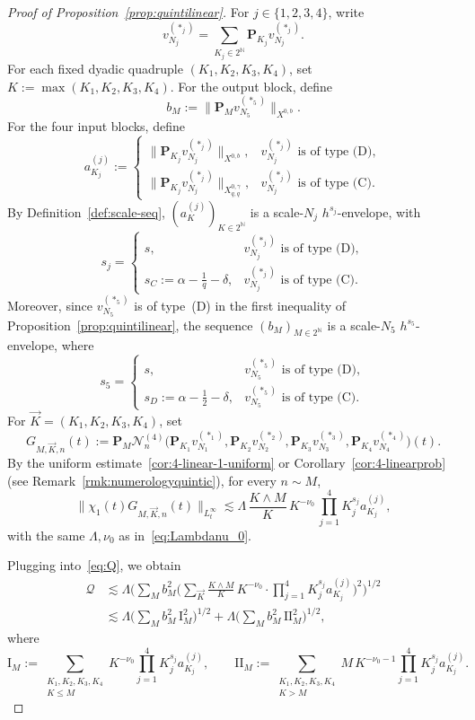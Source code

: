\documentclass[11pt,reqno,english]{amsart}
\numberwithin{equation}{section}
\theoremstyle{plain}
\theoremstyle{definition}
\theoremstyle{remark}
\newcommand{\N}{\mathbb{N}}
\begin{document}
\begin{proof}[Proof of Proposition~\ref{prop:quintilinear}]
For $j\in\{1,2,3,4\}$, write
\[
v_{N_j}^{(\ast_j)}
=
\sum_{K_j\in 2^{\N}}\mathbf{P}_{K_j}v_{N_j}^{(\ast_j)}.
\]
For each fixed dyadic quadruple $(K_1,K_2,K_3,K_4)$, set $K:=\max(K_1,K_2,K_3,K_4)$.
For the output block, define
\[
b_M:=\|\mathbf{P}_M v_{N_5}^{(\ast_5)}\|_{X^{0,b}}.
\]
For the four input blocks, define
\[
a_{K_j}^{(j)}
:=
\begin{cases}
	\|\mathbf{P}_{K_j}v_{N_j}^{(\ast_j)}\|_{X^{0,b}},
	& v_{N_j}^{(\ast_j)} \text{ is of type (D)},\\[1mm]
	\|\mathbf{P}_{K_j}v_{N_j}^{(\ast_j)}\|_{X_{q,q}^{0,\gamma}},
	& v_{N_j}^{(\ast_j)} \text{ is of type (C)}.
\end{cases}
\]
By Definition~\ref{def:scale-seq}, $(a_K^{(j)})_{K\in 2^{\N}}$ is a scale-$N_j$ $h^{s_j}$-envelope, with
\[
s_j=
\begin{cases}
	s,& v_{N_j}^{(\ast_j)} \text{ is of type (D)},\\
	s_C:=\alpha-\frac1q-\delta,& v_{N_j}^{(\ast_j)} \text{ is of type (C)}.
\end{cases}
\]
Moreover, since $v_{N_5}^{(\ast_5)}$ is of type~(D) in the first inequality of
Proposition~\ref{prop:quintilinear}, the sequence $(b_M)_{M\in 2^{\N}}$ is a scale-$N_5$ $h^{s_5}$-envelope, where
\[
s_5=\begin{cases}
	s,& v_{N_5}^{(\ast_5)} \text{ is of type (D)},\\
	s_D:=\alpha-\frac12-\delta,& v_{N_5}^{(\ast_5)} \text{ is of type (C)}.
\end{cases}
\]
For $\vec{K}=(K_1,K_2,K_3,K_4)$, set
\[
G_{M,\vec{K},n}(t):=\mathbf{P}_M\mathcal{N}_n^{(4)}
\big(
\mathbf{P}_{K_1}v_{N_1}^{(\ast_1)},
\mathbf{P}_{K_2}v_{N_2}^{(\ast_2)},
\mathbf{P}_{K_3}v_{N_3}^{(\ast_3)},
\mathbf{P}_{K_4}v_{N_4}^{(\ast_4)}
\big)(t).
\]
By the uniform estimate~\eqref{cor:4-linear-1-uniform} or Corollary~\ref{cor:4-linearprob} (see Remark~\ref{rmk:numerologyquintic}),
for every $n\sim M$,
\begin{equation}\label{eq:blockwise-pointwise-case2}
	\|\chi_1(t) G_{M,\vec{K},n}(t)\|_{L_t^\infty}
	\lesssim
	\Lambda\,\frac{K\wedge M}{K}\,
	K^{-\nu_0}\,
	\prod_{j=1}^4 K_j^{s_j}a_{K_j}^{(j)},
\end{equation}
with the same $\Lambda,\nu_0$ as in~\eqref{eq:Lambdanu_0}.

Plugging into~\eqref{eq:Q}, we obtain
\begin{align*}
	\mathcal{Q}&\lesssim \Lambda\Big(\sum_{M}b_M^2\Big(\sum_{\vec{K}}\frac{K\wedge M}{K}\, K^{-\nu_0}\cdot\prod_{j=1}^4 K_j^{s_j}a_{K_j}^{(j)}
	\Big)^2\Big)^{1/2}\\
	&\lesssim \Lambda
	\Big(\sum_{M}b_M^2\,\mathrm{I}_M^2\Big)^{1/2}+\Lambda
	\Big(\sum_{M}b_M^2\,\mathrm{II}_M^2\Big)^{1/2},
\end{align*}
where
\[
\mathrm{I}_M:=\sum_{\substack{K_1,K_2,K_3,K_4\\
		K\leq M
}} K^{-\nu_0}\prod_{j=1}^4 K_j^{s_j}a_{K_j}^{(j)},\qquad \mathrm{II}_M:=\sum_{\substack{K_1,K_2,K_3,K_4\\
		K> M
}} M\, K^{-\nu_0-1}\prod_{j=1}^4 K_j^{s_j}a_{K_j}^{(j)}.
\]


\end{proof}
\end{document}
